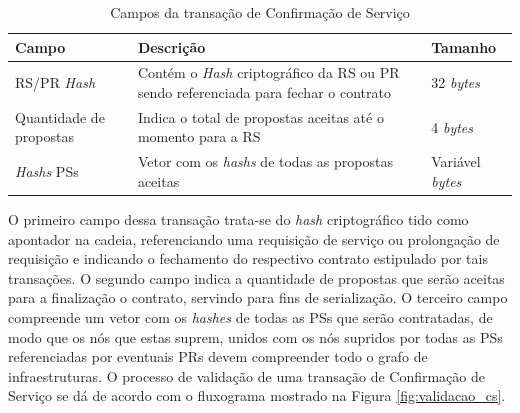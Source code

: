 \begin{table}[ht]
\centering
    \begin{tabular}{|m{}|m{}|m{}|}
    \hline
         \textbf{Campo} & \textbf{Descrição} & \textbf{Tamanho}  \\
         \hline
         \ac{RS}/\ac{PR} \textit{Hash} & Contém o \textit{Hash} criptográfico da \ac{RS} ou \ac{PR} sendo referenciada para fechar o contrato & 32 \textit{bytes} \\
         \hline
         Quantidade de propostas & Indica o total de propostas aceitas até o momento para a \ac{RS} & 4 \textit{bytes} \\
         \hline
         \textit{Hashs} \acp{PS} & Vetor com os \textit{hashs} de todas as propostas aceitas & Variável \textit{bytes} \\
    \hline
    \end{tabular}
    \caption{Campos da transação de Confirmação de Serviço}
    \label{tabela:cs}
\end{table}

O primeiro campo dessa transação trata-se do \textit{hash} criptográfico tido como apontador na cadeia, referenciando uma requisição de serviço ou prolongação de requisição e indicando o fechamento do respectivo contrato estipulado por tais transações. O segundo campo indica a quantidade de propostas que serão aceitas para a finalização o contrato, servindo para fins de serialização. O terceiro campo compreende um vetor com os \textit{hashes} de todas as \acp{PS} que serão contratadas, de modo que os nós que estas suprem, unidos com os nós supridos por todas as \acp{PS} referenciadas por eventuais \acp{PR} devem compreender todo o grafo de infraestruturas. O processo de validação de uma transação de Confirmação de Serviço se dá de acordo com o fluxograma mostrado na Figura \ref{fig:validacao_cs}.

